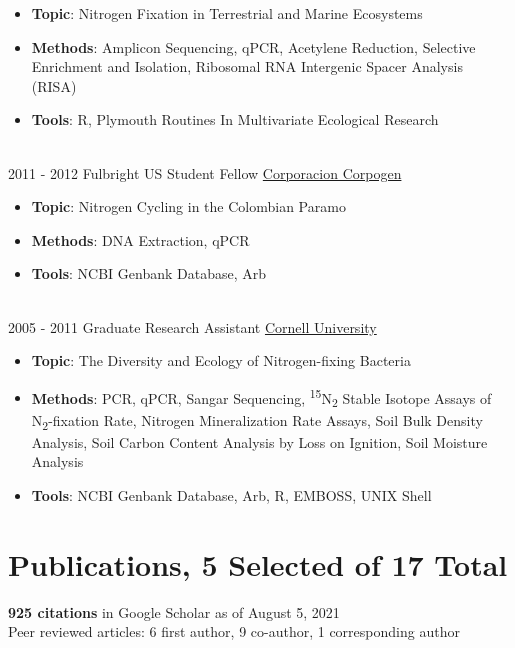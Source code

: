\documentclass[letterpaper]{twentysecondcv3} %
\begin{document}
\begin{twenty}
{{\begin{itemize}
        \item \textbf{Topic}: Nitrogen Fixation in Terrestrial and Marine Ecosystems
	\item \textbf{Methods}: Amplicon Sequencing, qPCR, Acetylene Reduction, Selective Enrichment and Isolation, Ribosomal RNA Intergenic Spacer Analysis (RISA)
        \item \textbf{Tools}: R, Plymouth Routines In Multivariate Ecological Research
    \end{itemize}}
        }
     \\
     \twentyitem
   		{2011 -}
		{2012}
        {Fulbright US Student Fellow}
        {\href{https://www.corpogen.org/}{Corporacion Corpogen}}
        {}
        {
        {\begin{itemize}
        \item \textbf{Topic}: Nitrogen Cycling in the Colombian Paramo
	\item \textbf{Methods}: DNA Extraction, qPCR
        \item \textbf{Tools}: NCBI Genbank Database, Arb
    \end{itemize}}
    	}
    \\   
    \twentyitem
   		{2005 -}
		{2011}
        {Graduate Research Assistant}
        {\href{https://www.cornell.edu/}{Cornell University}}
        {}
        {
        \begin{itemize}
        \item \textbf{Topic}: The Diversity and Ecology of Nitrogen-fixing Bacteria
	\item \textbf{Methods}: PCR, qPCR, Sangar Sequencing, \textsuperscript{15}N\textsubscript{2} Stable Isotope Assays of N\textsubscript{2}-fixation Rate, Nitrogen Mineralization Rate Assays, Soil Bulk Density Analysis, Soil Carbon Content Analysis by Loss on Ignition, Soil Moisture Analysis
        \item \textbf{Tools}: NCBI Genbank Database, Arb, R, EMBOSS, UNIX Shell
    \end{itemize}
        }
        
\end{twenty}

\section{Publications, 5 Selected of 17 Total}
\textbf{925 citations} in Google Scholar as of August 5, 2021\\
Peer reviewed articles: 6 first author, 9 co-author, 1 corresponding author
\end{document}
